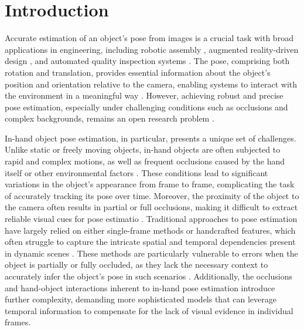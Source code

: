 \section{Introduction}
\label{sec:intro}

Accurate estimation of an object's pose from images is a crucial task with broad applications in engineering, including robotic assembly \cite{hoang2023grasp, hoang2022context, hoang2024collision}, augmented reality-driven design \cite{hoang2024object, hoang2025attention, tan2024attention}, and automated quality inspection systems \cite{marullo20236d, du2021vision, cho2024integration}. The pose, comprising both rotation and translation, provides essential information about the object's position and orientation relative to the camera, enabling systems to interact with the environment in a meaningful way \cite{hoang2024graspability, castro2023crt, peng2019pvnet, hoang2022voting}. However, achieving robust and precise pose estimation, especially under challenging conditions such as occlusions and complex backgrounds, remains an open research problem \cite{marullo20236d, vu2024occlusion, chen2016innovative}. 

In-hand object pose estimation, in particular, presents a unique set of challenges. Unlike static or freely moving objects, in-hand objects are often subjected to rapid and complex motions, as well as frequent occlusions caused by the hand itself or other environmental factors \cite{chao2021dexycb, hoang2024multi, garcia2018first, llop2022benchmarking}. These conditions lead to significant variations in the object's appearance from frame to frame, complicating the task of accurately tracking its pose over time. Moreover, the proximity of the object to the camera often results in partial or full occlusions, making it difficult to extract reliable visual cues for pose estimatio \cite{hoang2016sub, hoang2020panoptic}. Traditional approaches to pose estimation have largely relied on either single-frame methods or handcrafted features, which often struggle to capture the intricate spatial and temporal dependencies present in dynamic scenes \cite{billings2019silhonet, peng2019pvnet}. These methods are particularly vulnerable to errors when the object is partially or fully occluded, as they lack the necessary context to accurately infer the object's pose in such scenarios \cite{hoang2019object, hoang2020object}. Additionally, the occlusions and hand-object interactions inherent to in-hand pose estimation introduce further complexity, demanding more sophisticated models that can leverage temporal information to compensate for the lack of visual evidence in individual frames.


